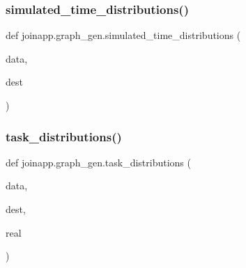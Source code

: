 \subsubsection{\texorpdfstring{simulated\_time\_distributions()}{simulated\_time\_distributions()}}
{\footnotesize\ttfamily def joinapp.\+graph\+\_\+gen.\+simulated\+\_\+time\+\_\+distributions (\begin{DoxyParamCaption}\item[{}]{data,  }\item[{}]{dest }\end{DoxyParamCaption})}

\mbox{\label{namespacejoinapp_1_1graph__gen_a606bd1ce0483920598fb156f840e2637}} 
\subsubsection{\texorpdfstring{task\_distributions()}{task\_distributions()}}
{\footnotesize\ttfamily def joinapp.\+graph\+\_\+gen.\+task\+\_\+distributions (\begin{DoxyParamCaption}\item[{}]{data,  }\item[{}]{dest,  }\item[{}]{real }\end{DoxyParamCaption})}

